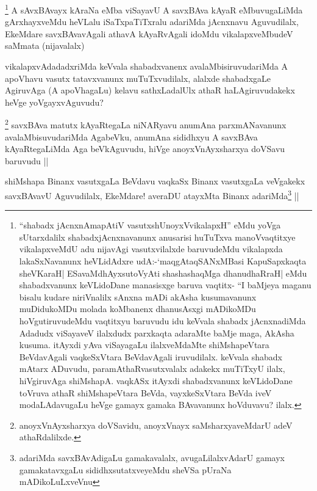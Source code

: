 \begin{artha}
\footnote[1]{``shabadx jAcnxnAmapAtiV vasutxshUnoyxVvikalapxH'' eMdu yoVga sUtarxdalilx shabadxjAcnxnavanunx anusarisi huTuTxva manoVvaqtitxye vikalapxveMdU adu nijavAgi vasutxvilalxde baruvudeMdu vikalapxda lakaSxNavanunx heVLidAdxre udA:-`maqgAtaqSANxMBasi KapuSapxkaqta sheVKaraH| ESavaMdhAyxsutoVyAti shashashaqMga dhanudhaRraH| eMdu shabadxvanunx keVLidoDane manasisxge baruva vaqtitx- ``I baMjeya maganu bisalu kudare niriVnalilx sAnxna mADi akAsha kusumavanunx muDidukoMDu molada koMbanenx dhanusAsxgi mADikoMDu hoVgutiruvudeMdu vaqtitxyu baruvudu idu keVvala shabadx jAcnxnadiMda Adadudx viSayaveV ilalxdudx
parxkaqta adaraMte baMje maga, AkAsha kusuma. itAyxdi yAva viSayagaLu ilalxveMdaMte shiMshapeVtara BeVdavAgali vaqkeSxVtara BeVdavAgali iruvudilalx. keVvala shabadx mAtarx ADuvudu, paramAthaRvasutxvalalx adakekx muTiTxyU ilalx, hiVgiruvAga shiMshapA. vaqkASx itAyxdi shabadxvanunx keVLidoDane toVruva athaR shiMshapeVtara BeVda, vayxkeSxVtara BeVda iveV modaLAdavugaLu heVge gamayx gamaka BAvavanunx hoVduvavu? ilalx.}
A sAvxBAvayx kAraNa eMba viSayavU A savxBAva kAyaR eMbuvugaLiMda gArxhayxveMdu heVLalu iSaTxpaTiTxralu adariMda jAcnxnavu Aguvudilalx, EkeMdare savxBAvavAgali athavA kAyaRvAgali idoMdu vikalapxveMbudeV saMmata (nijavalalx)
\end{artha}

\begin{artha}
vikalapxvAdadadxriMda keVvala shabadxvanenx avalaMbisiruvudariMda A apoVhavu vasutx tatavxvanunx muTuTxvudilalx, alalxde shabadxgaLe AgiruvAga (A apoVhagaLu) kelavu sathxLadalUlx athaR haLAgiruvudakekx heVge yoVgayxvAguvudu?
\end{artha}

\begin{artha}
\footnote[2]{anoyxVnAyxsharxya doVSavidu, anoyxVnayx saMsharxyaveMdarU adeV athaRdalilxde.}
savxBAva matutx kAyaRtegaLa niNARyavu anumAna parxmANavanunx avalaMbisuvudariMda AgabeVku, anumAna sididhxyu A savxBAva kAyaRtegaLiMda Aga beVkAguvudu, hiVge anoyxVnAyxsharxya doVSavu baruvudu ||
\end{artha}


\begin{artha}
shiMshapa Binanx vasutxgaLa BeVdavu vaqkaSx Binanx vasutxgaLa veVgakekx savxBAvavU Aguvudilalx, EkeMdare! averaDU atayxMta Binanx adariMda\footnote[1]{adariMda savxBAvAdigaLu gamakavalalx, avugaLilalxvAdarU gamayx gamakatavxgaLu sididhxsutatxveyeMdu sheVSa pUraNa mADikoLuLxveVnu} ||
\end{artha}

